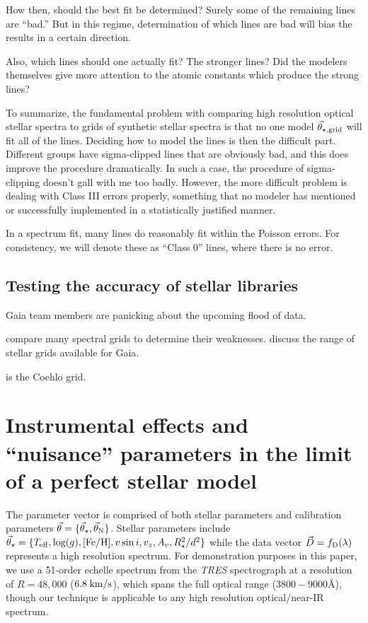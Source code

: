 \documentclass[preprint]{aastex} %
\newcommand{\vt}{\vec{\theta}}
\newcommand{\vg}{\vt_{\star, {\rm grid}}}
\newcommand{\vstar}{\vt_{\star}}
\newcommand{\vN}{\vt_{\rm N}}
\newcommand{\fD}{f_{\rm D}}
\newcommand{\vD}{\vec{D}}
\begin{document}
How then, should the best fit be determined? Surely some of the remaining lines are ``bad.'' But in this regime, determination of which lines are bad will bias the results in a certain direction.

Also, which lines should one actually fit? The stronger lines? Did the modelers themselves give more attention to the atomic constants which produce the strong lines?

To summarize, the fundamental problem with comparing high resolution optical stellar spectra to grids of synthetic stellar spectra is that no one model $\vg$ will fit all of the lines. Deciding how to model the lines is then the difficult part. Different groups have sigma-clipped lines that are obviously bad, and this does improve the procedure dramatically. In such a case, the procedure of sigma-clipping doesn't gall with me too badly. However, the more difficult problem is dealing with Class III errors properly, something that no modeler has mentioned or successfully implemented in a statistically justified manner.

In a spectrum fit, many lines do reasonably fit within the Poisson errors. For consistency, we will denote these as ``Class 0'' lines, where there is no error.

\subsection{Testing the accuracy of stellar libraries}
Gaia team members are panicking about the upcoming flood of data.

\citet{mc07} compare many spectral grids to determine their weaknesses. \citep{svt+11} discuss the range of stellar grids available for Gaia.

\citep{cbm+05} is the Coehlo grid.


\section{Instrumental effects and ``nuisance'' parameters in the limit of a perfect stellar model}

The parameter vector is comprised of both stellar parameters and calibration parameters $\vt = \{\vstar, \vN \}$. Stellar parameters include $\vstar = \{T_{\rm eff}, \log(g), [{\rm Fe}/{\rm H}], v \sin i, v_z, A_v, R_\star^2/d^2 \}$ while the data vector $\vD = \fD(\lambda)$ represents a high resolution spectrum. For demonstration purposes in this paper, we use a 51-order echelle spectrum from the \emph{TRES} spectrograph at a resolution of $R=48,000$ ($6.8\;{\rm km/s}$), which spans the full optical range ($3800-9000$\AA), though our technique is applicable to any high resolution optical/near-IR spectrum.
\end{document}
